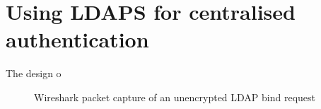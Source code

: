 \documentclass[11pt,a4paper]{scrartcl}
\begin{document}
\newpage

\section*{Using LDAPS for centralised authentication}
\begin{refsection}

The design o

\begin{figure}[h]
	\centering
	\qquad
	\caption{Wireshark packet capture of an unencrypted LDAP bind request}
\end{figure}

\printbibliography
\end{refsection}
\end{document}
